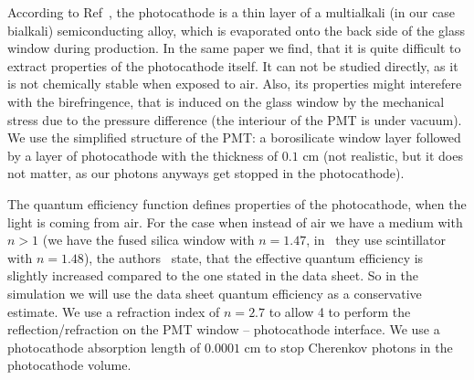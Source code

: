 According to Ref~\cite{pcpaper}, the photocathode is a thin layer of a multialkali (in our case bialkali) semiconducting alloy, which is evaporated onto the back side of the glass window during production. In the same paper we find, that it is quite difficult to extract properties of the photocathode itself. It can not be studied directly, as it is not chemically stable when exposed to air. Also, its properties might interefere with the birefringence, that is induced on the glass window by the mechanical stress due to the pressure difference (the interiour of the PMT is under vacuum). We use the simplified structure of the PMT: a borosilicate window layer followed by a layer of photocathode with the thickness of $0.1$ cm (not realistic, but it does not matter, as our photons anyways get stopped in the photocathode). 

The quantum efficiency function defines properties of the photocathode, when the light is coming from air. For the case when instead of air we have a medium with $n > 1$ (we have the fused silica window with $n = 1.47$, in~\cite{pcpaper} they use scintillator with $n = 1.48$), the authors~\cite{pcpaper} state, that the effective quantum efficiency is slightly increased compared to the one stated in the data sheet. So in the simulation we will use the data sheet quantum efficiency as a conservative estimate. We use a refraction index of $n = 2.7$ to allow {\geant}4 to perform the reflection/refraction on the PMT window -- photocathode interface. We use a photocathode absorption length of $0.0001$ cm to stop Cherenkov photons in the photocathode volume.





